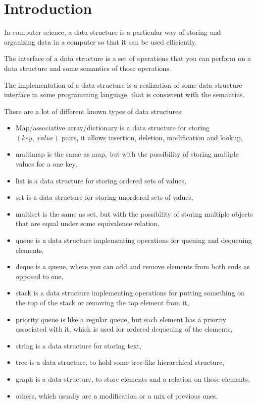 \documentclass[a4paper,11pt]{article}
\begin{document}
\tableofcontents

\vfill

\section{Introduction} \label{sec:intro}
	In computer science, a data structure is a particular way of storing and organizing data in a computer so that
	it can be used efficiently\cite{Wids}.

	The interface of a data structure is a set of operations that you can perform on a data structure and some
	semantics of those operations.

	The implementation of a data structure is a realization of some data structure interface in some programming
	language, that is consistent with the semantics.

	There are a lot of different known types of data structures:
	\begin{itemize}
		\item Map/associative array/dictionary is a data structure for storing $(key,\;value)$ pairs, it allows
			insertion, deletion, modification and lookup,
		\item multimap is the same as map, but with the possibility of storing multiple values for a one key,
		\item list is a data structure for storing ordered sets of values,
		\item set is a data structure for storing unordered sets of values,
		\item multiset is the same as set, but with the possibility of storing multiple objects that are equal
			under some equivalence relation,
		\item queue is a data structure implementing operations for queuing and dequeuing elements,
		\item deque is a queue, where you can add and remove elements from both ends as opposed to one,
		\item stack is a data structure implementing operations for putting something on the top of the stack or
			removing the top element from it,
		\item priority queue is like a regular queue, but each element has a priority associated with it, which
			is used for ordered dequeuing of the elements,
		\item string is a data structure for storing text,
		\item tree is a data structure, to hold some tree-like hierarchical structure,
		\item graph is a data structure, to store elements and a relation on those elements,
		\item others, which usually are a modification or a mix of previous ones.
	\end{itemize}
\end{document}
